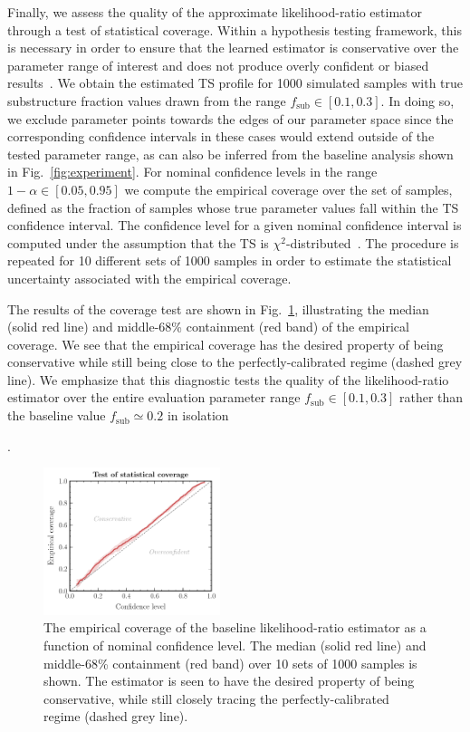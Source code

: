 \documentclass[twocolumn,linenumbers,anonymous]{aastex631}
\newcommand{\changes}[1]{{{\color{red}#1}}}
\begin{document}
\changes{Finally, we assess the quality of the approximate likelihood-ratio estimator through a test of statistical coverage. Within a hypothesis testing framework, this is necessary in order to ensure that the learned estimator is conservative over the parameter range of interest and does not produce overly confident or biased results~\citep{hermans2021averting}. We obtain the estimated TS profile for 1000 simulated samples with true substructure fraction values drawn from the range $f_\mathrm{sub}\in[0.1, 0.3]$. In doing so, we exclude parameter points towards the edges of our parameter space since the corresponding confidence intervals in these cases would extend outside of the tested parameter range, as can also be inferred from the baseline analysis shown in Fig.~\ref{fig:experiment}. For nominal confidence levels in the range $1-\alpha\in[0.05, 0.95]$ we compute the empirical coverage over the set of samples, defined as the fraction of samples whose true parameter values fall within the TS confidence interval. The confidence level for a given nominal confidence interval is computed under the assumption that the TS is $\chi^2$-distributed~\citep{10.1214/aoms/1177732360}. The procedure is repeated for 10 different sets of 1000 samples in order to estimate the statistical uncertainty associated with the empirical coverage.

The results of the coverage test are shown in Fig.~\ref{fig:coverage}, illustrating the median (solid red line) and middle-68\% containment (red band) of the empirical coverage. We see that the empirical coverage has the desired property of being conservative while still being close to the perfectly-calibrated regime (dashed grey line). We emphasize that this diagnostic tests the quality of the likelihood-ratio estimator over the entire evaluation parameter range $f_\mathrm{sub}\in[0.1, 0.3]$ rather than the baseline value $f_\mathrm{sub}\simeq0.2$ in isolation}.

\begin{figure}[!htbp]
\centering
\includegraphics[width=0.46\textwidth]{coverage}
\caption{\changes{The empirical coverage of the baseline likelihood-ratio estimator as a function of nominal confidence level. The median (solid red line) and middle-68\% containment (red band) over 10 sets of 1000 samples is shown. The estimator is seen to have the desired property of being conservative, while still closely tracing the perfectly-calibrated regime (dashed grey line).}}
\label{fig:coverage}
\end{figure}
    
\end{document}
